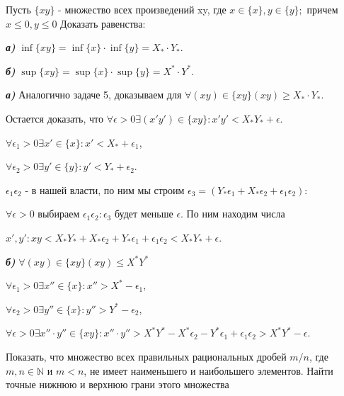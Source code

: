 \documentclass[10pt]{article}
\begin{document}
\begin{problem}
Пусть $\{xy\}$ - множество всех произведений xy, где $x \in \{x\},y \in \{y\};$ причем $x\leq 0,y\leq 0$ Доказать равенства:

\emph{\textbf{а)}} $\inf\{xy\}=\inf\{x\}\cdot\inf\{y\}=X_*\cdot Y_*$.

\emph{\textbf{б)}} $\sup\{xy\}=\sup\{x\}\cdot\sup\{y\}=X^*\cdot Y^*$.
\end{problem}

\begin{solution}
\emph{\textbf{а)}} Аналогично задаче 5, доказываем для $\forall (xy)\in\{xy\} (xy)\geq X_*\cdot Y_*$.

Остается доказать, что $\forall \epsilon >0 \exists (x'y')\in\{xy\}: x'y'<X_* Y_* + \epsilon$.

$\forall \epsilon_1 >0 \exists x' \in \{x\}: x'<X_*+\epsilon_1$,

$\forall \epsilon_2>0 \exists y' \in \{y\}: y'<Y_* + \epsilon_2$.

$\epsilon_1 \epsilon_2$ - в нашей власти, по ним мы строим $\epsilon_3=(Y_*\epsilon_1 + X_*\epsilon_2 + \epsilon_1 \epsilon_2)$:

$\forall \epsilon > 0$ выбираем $\epsilon_1 \epsilon_2 : \epsilon_3$ будет меньше $\epsilon$. По ним находим числа 

$x',y' : xy<X_*Y_* + X_*\epsilon_2 + Y_*\epsilon_1 + \epsilon_1 \epsilon_2 < X_*Y_* + \epsilon$.


\emph{\textbf{б)}}
$\forall(xy) \in \{xy\} (xy)\leq X^* Y^*$

$\forall \epsilon_1 >0 \exists x'' \in \{x\}: x''>X^*-\epsilon_1$,

$\forall \epsilon_2 >0 \exists y'' \in \{x\}: y''>Y^*-\epsilon_2$,

$\forall \epsilon >0 \exists x''\cdot y'' \in \{xy\} : x''\cdot y'' > X^*Y^* - X^* \epsilon_2 - Y^*\epsilon_1 + \epsilon_1 \epsilon_2 > X^*Y^*-\epsilon$.
\end{solution}



\begin{problem}
Показать, что множество всех правильных рациональных дробей $m/n$, где $m,n\in\mathbb{N}$ и $m<n$, не имеет наименьшего и наибольшего элементов. Найти точные нижнюю и верхнюю грани этого множества
\end{problem}
\end{document}
